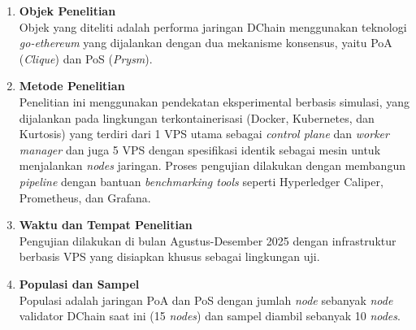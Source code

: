 \begin{enumerate}
    \item \textbf{Objek Penelitian} \\
    Objek yang diteliti adalah performa jaringan DChain menggunakan teknologi \textit{go-ethereum} yang dijalankan dengan dua mekanisme konsensus, yaitu PoA (\textit{Clique}) dan PoS (\textit{Prysm}).
    
    \item \textbf{Metode Penelitian} \\
    Penelitian ini menggunakan pendekatan eksperimental berbasis simulasi, yang dijalankan pada lingkungan terkontainerisasi (Docker, Kubernetes, dan Kurtosis) yang terdiri dari 1 VPS utama sebagai \textit{control plane} dan \textit{worker manager} dan juga 5 VPS dengan spesifikasi identik sebagai mesin untuk menjalankan \textit{nodes} jaringan. Proses pengujian dilakukan dengan membangun \textit{pipeline} dengan bantuan \textit{benchmarking tools} seperti Hyperledger Caliper, Prometheus, dan Grafana.
    
    \item \textbf{Waktu dan Tempat Penelitian} \\
    Pengujian dilakukan di bulan Agustus-Desember 2025 dengan infrastruktur berbasis VPS yang disiapkan khusus sebagai lingkungan uji.
    
    \item \textbf{Populasi dan Sampel} \\
    Populasi adalah jaringan PoA dan PoS dengan jumlah \textit{node} sebanyak \textit{node} validator DChain saat ini (15 \textit{nodes}) dan sampel diambil sebanyak 10 \textit{nodes}.
    

\end{enumerate}
